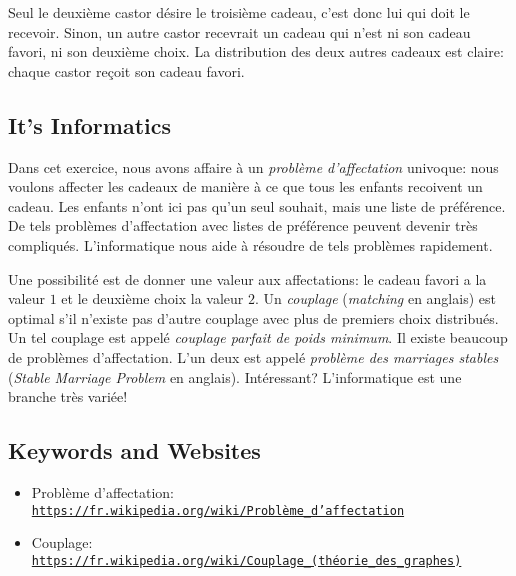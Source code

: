 \documentclass[a4paper,11pt]{report}
\newcommand{\BrochureUrlText}[1]{\texttt{#1}}
\begin{document}
Seul le deuxième castor désire le troisième cadeau, c’est donc lui qui doit le recevoir. Sinon, un autre castor recevrait un cadeau qui n’est ni son cadeau favori, ni son deuxième choix. La distribution des deux autres cadeaux est claire: chaque castor reçoit son cadeau favori.


\subsection*{It’s Informatics}

Dans cet exercice, nous avons affaire à un \emph{problème d’affectation} univoque: nous voulons affecter les cadeaux de manière à ce que tous les enfants recoivent un cadeau. Les enfants n’ont ici pas qu’un seul souhait, mais une liste de préférence. De tels problèmes d’affectation avec listes de préférence peuvent devenir très compliqués. L’informatique nous aide à résoudre de tels problèmes rapidement.

Une possibilité est de donner une valeur aux affectations: le cadeau favori a la valeur $1$ et le deuxième choix la valeur $2$. Un \emph{couplage} (\emph{matching} en anglais) est optimal s’il n’existe pas d’autre couplage avec plus de premiers choix distribués. Un tel couplage est appelé \emph{couplage parfait de poids minimum}. Il existe beaucoup de problèmes d’affectation. L’un deux est appelé \emph{problème des marriages stables} (\emph{Stable Marriage Problem} en anglais). Intéressant? L’informatique est une branche très variée!

{\raggedright

\subsection*{Keywords and Websites}

\begin{itemize}
  \item Problème d’affectation: \href{https://fr.wikipedia.org/wiki/Probl\%C3\%A8me_d\%27affectation}{\BrochureUrlText{https://fr.wikipedia.org/wiki/Problème\_d’affectation}}
  \item Couplage: \href{https://fr.wikipedia.org/wiki/Couplage_(th\%C3\%A9orie_des_graphes)}{\BrochureUrlText{https://fr.wikipedia.org/wiki/Couplage\_(théorie\_des\_graphes)}}
\end{itemize}


}
\end{document}
